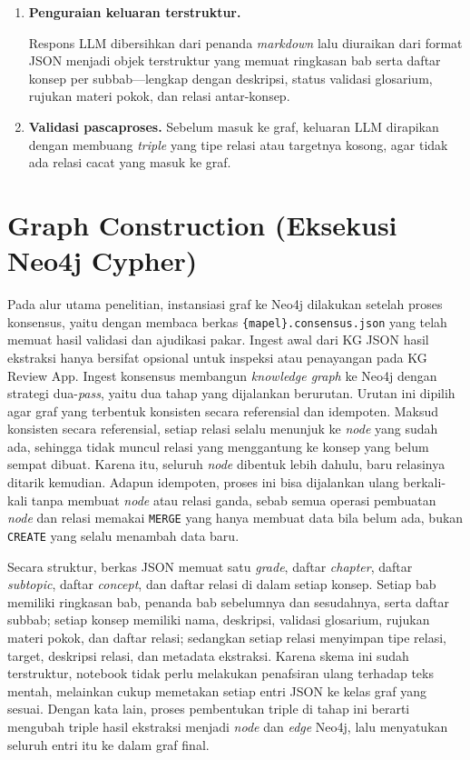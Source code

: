 \documentclass[../../thesis]{subfiles}
\begin{document}
\begin{enumerate}
  \item \textbf{Penguraian keluaran terstruktur.}

  Respons LLM dibersihkan dari penanda \textit{markdown} lalu diuraikan dari
  format JSON menjadi objek terstruktur yang memuat ringkasan bab serta daftar
  konsep per subbab---lengkap dengan deskripsi, status validasi glosarium,
  rujukan materi pokok, dan relasi antar-konsep.

  \item \textbf{Validasi pascaproses.} Sebelum masuk ke graf, keluaran LLM
  dirapikan dengan membuang \textit{triple} yang tipe relasi atau targetnya kosong,
  agar tidak ada relasi cacat yang masuk ke graf.
\end{enumerate}

\section{Graph Construction (Eksekusi Neo4j Cypher)}\label{sec:graph-construction}

Pada alur utama penelitian, instansiasi graf ke Neo4j dilakukan setelah proses konsensus,
yaitu dengan membaca berkas \texttt{\{mapel\}.consensus.json} yang telah memuat
hasil validasi dan ajudikasi pakar. Ingest awal dari KG JSON hasil ekstraksi
hanya bersifat opsional untuk inspeksi atau penayangan pada KG Review App.
Ingest konsensus membangun \textit{knowledge graph} ke Neo4j dengan strategi
dua-\textit{pass}, yaitu dua tahap yang dijalankan berurutan. Urutan ini
dipilih agar graf yang terbentuk konsisten secara referensial dan idempoten. Maksud konsisten secara referensial,
setiap relasi selalu menunjuk ke \textit{node} yang sudah ada, sehingga tidak
muncul relasi yang menggantung ke konsep yang belum sempat dibuat. Karena itu,
seluruh \textit{node} dibentuk lebih dahulu, baru relasinya ditarik kemudian.
Adapun idempoten, proses ini bisa dijalankan ulang berkali-kali tanpa membuat
\textit{node} atau relasi ganda, sebab semua operasi pembuatan \textit{node} dan
relasi memakai \texttt{MERGE} yang hanya membuat data bila belum ada, bukan
\texttt{CREATE} yang selalu menambah data baru.

Secara struktur, berkas JSON memuat satu \textit{grade}, daftar
\textit{chapter}, daftar \textit{subtopic}, daftar \textit{concept}, dan daftar
relasi di dalam setiap konsep. Setiap bab memiliki ringkasan bab, penanda bab
sebelumnya dan sesudahnya, serta daftar subbab; setiap konsep memiliki nama,
deskripsi, validasi glosarium, rujukan materi pokok, dan daftar relasi; sedangkan
setiap relasi menyimpan tipe relasi, target, deskripsi relasi, dan metadata
ekstraksi. Karena skema ini sudah terstruktur, notebook tidak perlu melakukan
penafsiran ulang terhadap teks mentah, melainkan cukup memetakan setiap entri
JSON ke kelas graf yang sesuai. Dengan kata lain, proses pembentukan triple di
tahap ini berarti mengubah triple hasil ekstraksi menjadi \textit{node} dan
\textit{edge} Neo4j, lalu menyatukan seluruh entri itu ke dalam graf final.
\end{document}
